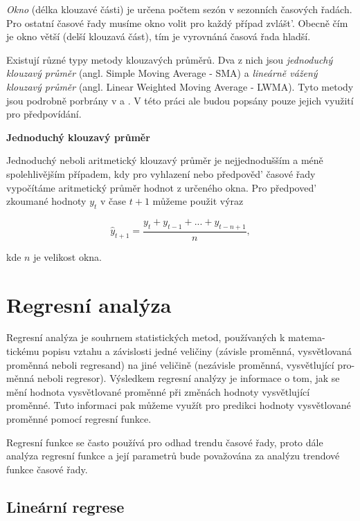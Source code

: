 \documentclass[a4paper,12pt,twoside]{scrreprt}
\begin{document}
\textit{Okno} (délka klouzavé části) je určena počtem sezón v sezonních časových řadách. Pro ostatní časové řady musíme okno volit pro každý případ zvlášt'. Obecně čím je okno větší (delší klouzavá část), tím je vyrovnáná časová řada hladší. \cite{arlt}

Existují různé typy metody klouzavých průměrů. Dva z nich jsou  \textit{jednoduchý klouzavý průměr} (angl. Simple Moving Average - SMA) a  \textit{lineárně vážený klouzavý průměr} (angl. Linear Weighted Moving Average - LWMA). Tyto metody jsou podrobně porbrány v \cite{arlt} a \cite{iastat}. V této práci ale budou popsány pouze jejich využití pro předpovídání.

\normalsize \textbf{Jednoduchý klouzavý průměr}

Jednoduchý neboli aritmetický klouzavý průměr je nejjednodušším a méně spolehlivějším případem, kdy pro vyhlazení nebo předpověd' časové řady vypočítáme aritmetický průměr hodnot z určeného okna. Pro předpoved' zkoumané hodnoty $y_t$ v čase $t+1$ můžeme použit výraz

\begin{equation}
\hat{y}_{t+1} = \frac{y_t + y_{t-1} + ... + y_{t-n+1}}{n},
\end{equation}

kde $n$ je velikost okna. 

\newpage
\section{Regresní analýza}
\vspace{0.5cm}

Regresní analýza je souhrnem statistických metod, používaných k matema-tickému popisu vztahu a závislosti jedné veličiny (závisle proměnná, vysvětlovaná proměnná neboli regresand) na jiné veličině (nezávisle proměnná, vysvětlující pro-měnná neboli regresor). Výsledkem regresní analýzy je informace o tom, jak se mění hodnota vysvětlované proměnné při změnách hodnoty vysvětlující proměnné. Tuto informaci pak můžeme využít pro predikci hodnoty vysvětlované proměnné pomocí regresní funkce. 

Regresní funkce se často používá pro odhad trendu časové řady, proto dále analýza regresní funkce a její parametrů bude považována za analýzu trendové funkce časové řady.

\subsection{Lineární regrese}
\end{document}
